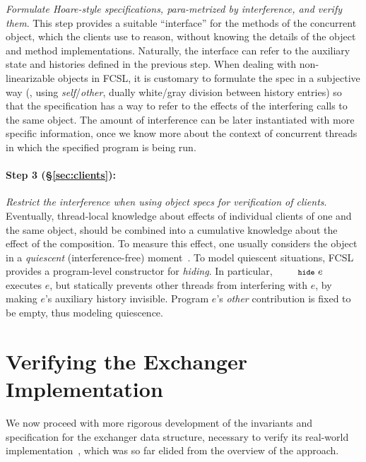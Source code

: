 \emph{Formulate Hoare-style specifications, para-metrized by
  interference, and verify them}.
%
This step provides a suitable ``interface'' for the methods of the
concurrent object, which the clients use to reason, without
knowing the details of the object and method implementations.
%
Naturally, the interface can refer to the auxiliary state and
histories defined in the previous step.
%
When dealing with non-linearizable objects in FCSL, it is customary to
formulate the spec in a subjective way (\ie, using
\emph{self}/\emph{other}, dually white/gray division between history
entries) so that the specification has a way to refer to the effects
of the interfering calls to the same object. 
%
The amount of interference can be later instantiated with more
specific information, once we know more about the context of
concurrent threads in which the specified program is being run.

\paragraph{Step 3 (\S\ref{sec:clients}):} 

\emph{Restrict the interference when using object specs for
  verification of clients}.
%
Eventually, thread-local knowledge about effects of individual clients
of one and the same object, should be combined into a cumulative
knowledge about the effect of the composition.
%
To measure this effect, one usually considers the object in a
\emph{quiescent} (interference-free) moment~\cite{Rinard:RACES}.
%
%
To model quiescent situations, FCSL provides a program-level
constructor for \emph{hiding}. In particular, $\esc{hide}\ e$ executes
$e$, but statically prevents other threads from interfering with $e$,
by making $e$'s auxiliary history invisible. Program $e$'s
\emph{other} contribution is fixed to be empty, thus modeling
quiescence.

\section{Verifying the Exchanger Implementation}
\label{sec:exchanger}

We now proceed with more rigorous development of the invariants and
specification for the exchanger data structure, necessary to verify
its real-world implementation~\cite{ExchangerClass}, which was so far
elided from the overview of the approach.



